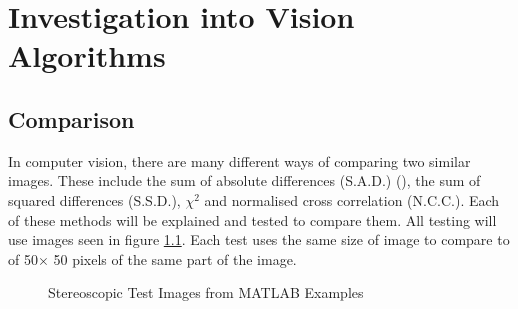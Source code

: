 \chapter{Investigation into Vision Algorithms} \label{Chapter:InvestigationVision}

\section{Comparison}
In computer vision, there are many different ways of comparing two similar images. These include the sum of absolute differences (S.A.D.) (\cite{Hamzah:DistanceDetection}), the sum of squared differences (S.S.D.), $\chi ^{2}$  and  normalised cross correlation (N.C.C.). Each of these methods will be explained and tested to compare them. All testing will use images seen in figure \ref{fig:StereoTest}. Each test uses the same size of image to compare to of 50$\times$ 50 pixels of the same part of the image. 

\begin{figure}
\centering
{}
\caption{Stereoscopic Test Images from MATLAB Examples}
\label{fig:StereoTest}
\end{figure}


